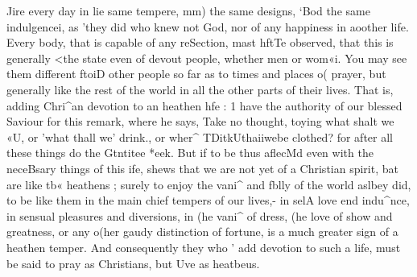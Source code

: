 \documentclass[
]{book}
\begin{document}
Jire every day in lie same tempere, mm) the same designs, `Bod the same indulgencei, as 'they did who knew not God, nor of any happiness in aoother life. Every body, that is capable of any reSection, mast hftTe observed, that this is generally \textless the state even of devout people, whether men or wom«i. You may see them different ftoiD other people so far as to times and places o( prayer, but generally like the rest of the world in all the other parts of their lives. That is, adding Chri\^{}an devotion to an heathen hfe : 1 have the authority of our blessed Saviour for this remark, where he says, Take no thought, toying what shalt we «U, or 'what thall we' drink., or wher\^{} TDitkUthaiiwebe clothed? for after all these things do the Gtntitee *eek. But if to be thus aflecMd even with the neceBsary things of this \textbar ife, shews that we are not yet of a Christian spirit, bat are like tb« heathens ; surely to enjoy the vani\^{} and fblly of the world aslbey did, to be like them in the main chief tempers of our lives,- in selA love end indu\^{}nce, in sensual pleasures and diversions, in (he vani\^{} of dress, (he love of show and greatness, or any o(her gaudy distinction of fortune, is a much greater sign of a heathen temper. And consequently they who ' add devotion to such a life, must be said to pray as Christians, but Uve as heatbeus.
\end{document}
